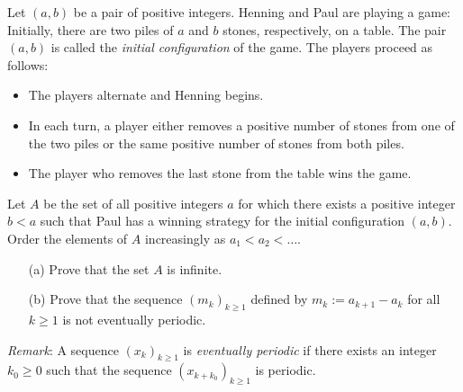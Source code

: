 Let $(a,b)$ be a pair of positive integers. Henning and Paul are playing a game: Initially, there are two piles of $a$ and $b$ stones, respectively, on a table. The pair $(a,b)$ is called the \textit{initial configuration} of the game. The players proceed as follows:

\begin{itemize}
    \item The players alternate and Henning begins.
    \item In each turn, a player either removes a positive number of stones from one of the two piles or the same positive number of stones from both piles.
    \item The player who removes the last stone from the table wins the game.
\end{itemize} 

Let $A$ be the set of all positive integers $a$ for which there exists a positive integer $b<a$ such that Paul has a winning strategy for the initial configuration $(a,b)$. Order the elements of $A$ increasingly as $a_1<a_2<\ldots$.

\begin{enumerate}
    \item[(a)] Prove that the set $A$ is infinite.
    \item[(b)] Prove that the sequence $(m_k)_{k \geq 1}$ defined by $m_k := a_{k+1} - a_k$ for all $k\geq 1$ is not eventually periodic.
\end{enumerate}

\textit{Remark}: A sequence $(x_k)_{k \geq 1}$ is \textit{eventually periodic} if there exists an integer $k_0\geq 0$ such that the sequence $(x_{k+k_0})_{k\geq 1}$ is periodic.

